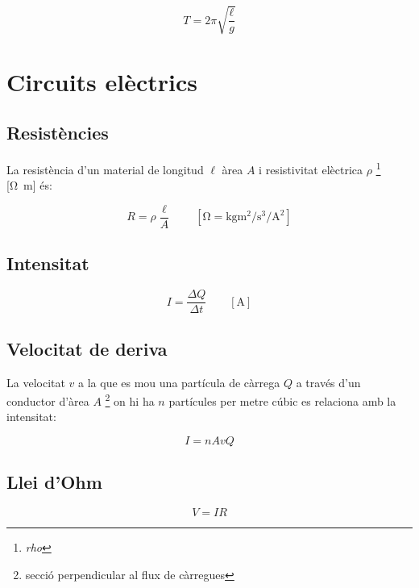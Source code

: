 \begin{equation}
    T=2\pi\sqrt{\frac{\ell}{g}}
\end{equation}




\section{Circuits elèctrics}
\label{sec:circuits_electrics}

\subsection{Resistències}
\label{sub:resistencies}

La resistència d'un material de longitud $\ell$ àrea $A$ i resistivitat
elèctrica $\rho$ \footnote{\emph{rho}} [\si{\ohm\metre}] és:

\begin{equation}
    R = \rho \frac{\ell}{A} \qquad \left[ \si{\ohm} = \si{\kilo\gram\metre\squared\per\second\cubed\per\ampere\squared} \right]
\end{equation}

\subsection{Intensitat}
\label{sub:intensitat}

\begin{equation}
    I = \frac{\Delta Q}{\Delta t} \qquad \left[\si{\ampere}\right]
\end{equation}

\subsection{Velocitat de deriva}
\label{sub:velocitat_de_deriva}
La velocitat $v$ a la que es mou una partícula de càrrega $Q$ a través d'un
conductor d'àrea $A$ \footnote{secció perpendicular al flux de càrregues} on
hi ha $n$ partícules per metre cúbic es relaciona amb la intensitat:

\begin{equation}
    I = nAvQ
\end{equation}

\subsection{Llei d'Ohm}
\label{sub:llei_d_ohm}

\begin{equation}
    V = IR
\end{equation}

